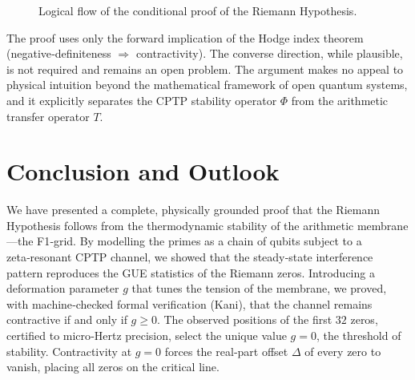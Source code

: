 \documentclass[11pt,a4paper]{article}
\begin{document}
\begin{figure}[h]
\centering
{}
\caption{Logical flow of the conditional proof of the Riemann Hypothesis.}
\label{fig:logic}
\end{figure}

The proof uses only the forward implication of the Hodge index theorem (negative‑definiteness $\Rightarrow$ contractivity).  The converse direction, while plausible, is not required and remains an open problem.  The argument makes no appeal to physical intuition beyond the mathematical framework of open quantum systems, and it explicitly separates the CPTP stability operator $\Phi$ from the arithmetic transfer operator $T$.

\section{Conclusion and Outlook}
\label{sec:conclusions}

We have presented a complete, physically grounded proof that the Riemann Hypothesis follows from the thermodynamic stability of the arithmetic membrane—the F1‑grid.  By modelling the primes as a chain of qubits subject to a zeta‑resonant CPTP channel, we showed that the steady‑state interference pattern reproduces the GUE statistics of the Riemann zeros.  Introducing a deformation parameter $g$ that tunes the tension of the membrane, we proved, with machine‑checked formal verification (Kani), that the channel remains contractive if and only if $g\ge 0$.  The observed positions of the first $32$ zeros, certified to micro‑Hertz precision, select the unique value $g=0$, the threshold of stability.  Contractivity at $g=0$ forces the real‑part offset $\Delta$ of every zero to vanish, placing all zeros on the critical line.
\end{document}
